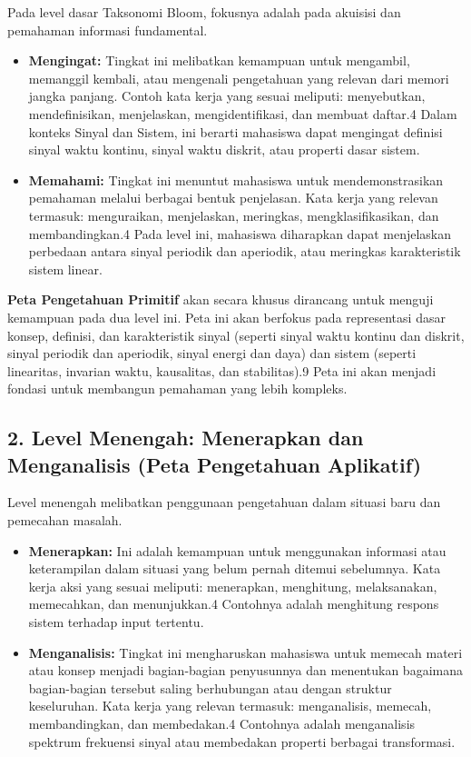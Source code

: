 \documentclass[
  letterpaper,
  DIV=11,
  numbers=noendperiod]{scrreprt}
\begin{document}
Pada level dasar Taksonomi Bloom, fokusnya adalah pada akuisisi dan
pemahaman informasi fundamental.

\begin{itemize}
\item
  \textbf{Mengingat:} Tingkat ini melibatkan kemampuan untuk mengambil,
  memanggil kembali, atau mengenali pengetahuan yang relevan dari memori
  jangka panjang. Contoh kata kerja yang sesuai meliputi: menyebutkan,
  mendefinisikan, menjelaskan, mengidentifikasi, dan membuat daftar.4
  Dalam konteks Sinyal dan Sistem, ini berarti mahasiswa dapat mengingat
  definisi sinyal waktu kontinu, sinyal waktu diskrit, atau properti
  dasar sistem.
\item
  \textbf{Memahami:} Tingkat ini menuntut mahasiswa untuk
  mendemonstrasikan pemahaman melalui berbagai bentuk penjelasan. Kata
  kerja yang relevan termasuk: menguraikan, menjelaskan, meringkas,
  mengklasifikasikan, dan membandingkan.4 Pada level ini, mahasiswa
  diharapkan dapat menjelaskan perbedaan antara sinyal periodik dan
  aperiodik, atau meringkas karakteristik sistem linear.
\end{itemize}

\textbf{Peta Pengetahuan Primitif} akan secara khusus dirancang untuk
menguji kemampuan pada dua level ini. Peta ini akan berfokus pada
representasi dasar konsep, definisi, dan karakteristik sinyal (seperti
sinyal waktu kontinu dan diskrit, sinyal periodik dan aperiodik, sinyal
energi dan daya) dan sistem (seperti linearitas, invarian waktu,
kausalitas, dan stabilitas).9 Peta ini akan menjadi fondasi untuk
membangun pemahaman yang lebih kompleks.

\subsection{2. Level Menengah: Menerapkan dan Menganalisis (Peta
Pengetahuan
Aplikatif)}\label{level-menengah-menerapkan-dan-menganalisis-peta-pengetahuan-aplikatif}

Level menengah melibatkan penggunaan pengetahuan dalam situasi baru dan
pemecahan masalah.

\begin{itemize}
\item
  \textbf{Menerapkan:} Ini adalah kemampuan untuk menggunakan informasi
  atau keterampilan dalam situasi yang belum pernah ditemui sebelumnya.
  Kata kerja aksi yang sesuai meliputi: menerapkan, menghitung,
  melaksanakan, memecahkan, dan menunjukkan.4 Contohnya adalah
  menghitung respons sistem terhadap input tertentu.
\item
  \textbf{Menganalisis:} Tingkat ini mengharuskan mahasiswa untuk
  memecah materi atau konsep menjadi bagian-bagian penyusunnya dan
  menentukan bagaimana bagian-bagian tersebut saling berhubungan atau
  dengan struktur keseluruhan. Kata kerja yang relevan termasuk:
  menganalisis, memecah, membandingkan, dan membedakan.4 Contohnya
  adalah menganalisis spektrum frekuensi sinyal atau membedakan properti
  berbagai transformasi.
\end{itemize}
\end{document}
